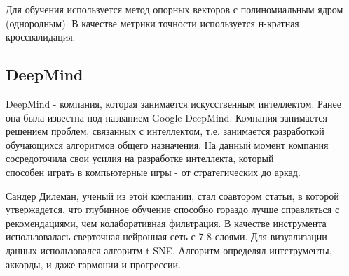 Для обучения используется метод опорных векторов с полиномиальным ядром (однородным). В качестве метрики точности используется н-крат\-ная кроссвалидация.

\subsection{DeepMind}
\label{sec:analogues:deepmind}
DeepMind - компания, которая занимается искусственным интеллектом. Ранее она была известна под названием Google DeepMind. Компания занимается решением проблем, связанных с интеллектом, т.е. занимается разработкой обучающихся алгоритмов общего назначения. На данный момент компания сосредоточила свои усилия на разработке интеллекта, который \\способен играть в компьютерные игры - от стратегических до аркад.

Сандер Дилеман, ученый из этой компании, стал соавтором статьи\cite{deepcontent}, в которой утвержадется, что глубинное обучение\cite{deep} способно гораздо лучше справляться с рекомендациями, чем колаборативная фильтрация. В качестве инструмента использовалась сверточная нейронная сеть с 7-8 слоями. Для визуализации данных использовался алгоритм t-SNE. Алгоритм определял интструменты, аккорды, и даже гармонии и прогрессии.
